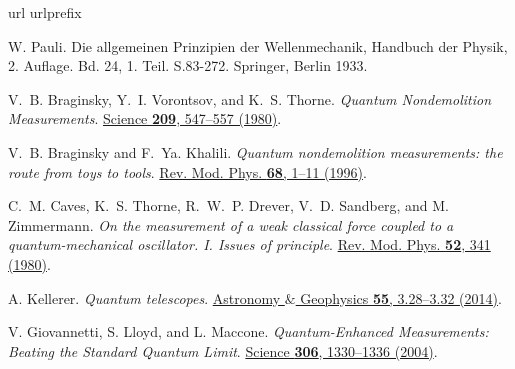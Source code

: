 \documentclass[prl,amsmath,amssymb,bibnotes,aps,longbibliography,12pt]{revtex4-1}
\begin{document}
\begin{thebibliography}{99}
\expandafter\ifx\csname url\endcsname\relax
  \def\url#1{\texttt{#1}}\fi
\expandafter\ifx\csname urlprefix\endcsname\relax\def\urlprefix{URL }\fi
\providecommand{\bibinfo}[2]{#2}
\providecommand{\eprint}[2][]{\url{#2}}

\bibinfo{author}{W. Pauli}.
\newblock \bibinfo{title}{Die allgemeinen Prinzipien der Wellenmechanik, Handbuch der Physik, 2. Auflage. Bd. 24, 1. Teil. S.83-272.}
  \bibinfo{publisher}{Springer},
  \bibinfo{address}{Berlin}  \bibinfo{year}{1933}.

\bibinfo{author}{V.~B. Braginsky}, \bibinfo{author}{Y.~I. Vorontsov}, and
\bibinfo{author}{K.~S. Thorne}.
\newblock \emph{\bibinfo{title}{Quantum Nondemolition Measurements}}.
\newblock
  \href{https://science.sciencemag.org/content/209/4456/547}{\bibinfo{journal}{Science} \textbf{\bibinfo{volume}{209}}, \bibinfo{pages}{547--557}
  (\bibinfo{year}{1980})}.
  
\bibinfo{author}{V.~B. Braginsky} and
\bibinfo{author}{F.~Ya. Khalili}.
\newblock \emph{\bibinfo{title}{Quantum nondemolition measurements: the route from toys to tools}}.
\newblock
  \href{https://journals.aps.org/rmp/abstract/10.1103/RevModPhys.68.1}{\bibinfo{journal}{Rev. Mod. Phys.} \textbf{\bibinfo{volume}{68}}, \bibinfo{pages}{1--11}
  (\bibinfo{year}{1996})}.
  
\bibinfo{author}{C.~M. Caves},
\bibinfo{author}{K.~S. Thorne},
\bibinfo{author}{R.~W.~P. Drever},
\bibinfo{author}{V.~D. Sandberg}, and
\bibinfo{author}{M. Zimmermann}.
\newblock \emph{\bibinfo{title}{On the measurement of a weak classical force coupled to a quantum-mechanical oscillator. I. Issues of principle}}.
\newblock
\href{https://journals.aps.org/rmp/abstract/10.1103/RevModPhys.52.341}{\bibinfo{journal}{Rev. Mod. Phys.} \textbf{\bibinfo{volume}{52}}, \bibinfo{pages}{341}
(\bibinfo{year}{1980})}.
  
\bibinfo{author}{A. Kellerer}.
\newblock \emph{\bibinfo{title}{Quantum telescopes}}.
\newblock
  \href{https://academic.oup.com/astrogeo/article/55/3/3.28/239181}{\bibinfo{journal}{Astronomy $\&$ Geophysics} \textbf{\bibinfo{volume}{55}}, \bibinfo{pages}{3.28--3.32}
  (\bibinfo{year}{2014})}.
  
\bibinfo{author}{V. Giovannetti},
\bibinfo{author}{S. Lloyd}, and
\bibinfo{author}{L. Maccone}.
\newblock \emph{\bibinfo{title}{Quantum-Enhanced Measurements: Beating the Standard Quantum Limit}}.
\newblock
\href{https://science.sciencemag.org/content/306/5700/1330.abstract}{\bibinfo{journal}{Science} \textbf{\bibinfo{volume}{306}}, \bibinfo{pages}{1330--1336}
(\bibinfo{year}{2004})}.


\end{thebibliography}
\end{document}
